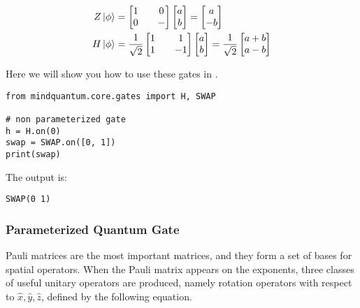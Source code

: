 \begin{align*}
    Z\ket{\phi} & =
    \begin{bmatrix}
        1 &  & 0 \\
        0 &  & -
    \end{bmatrix}
    \begin{bmatrix}
        a \\
        b
    \end{bmatrix}=
    \begin{bmatrix}
        a \\
        -b
    \end{bmatrix}  \\
    H\ket{\phi} & =
    \frac{1}{\sqrt{2}}
    \begin{bmatrix}
        1 &  & 1  \\
        1 &  & -1
    \end{bmatrix}
    \begin{bmatrix}
        a \\
        b
    \end{bmatrix}=
    \frac{1}{\sqrt{2}}
    \begin{bmatrix}
        a+b \\
        a-b
    \end{bmatrix}
\end{align*}

Here we will show you how to use these gates in \MindQuantum.

\begin{lstlisting}
from mindquantum.core.gates import H, SWAP

# non parameterized gate
h = H.on(0)
swap = SWAP.on([0, 1])
print(swap)
\end{lstlisting}
The output is:
\begin{lstlisting}
SWAP(0 1)
\end{lstlisting}

\subsubsection{Parameterized Quantum Gate}
Pauli matrices are the most important matrices, and they form a set of bases for spatial operators. When the Pauli matrix appears on the exponents, three classes of useful unitary operators are produced, namely rotation operators with respect to $\hat{x}, \hat{y}, \hat{z}$, defined by the following equation.


